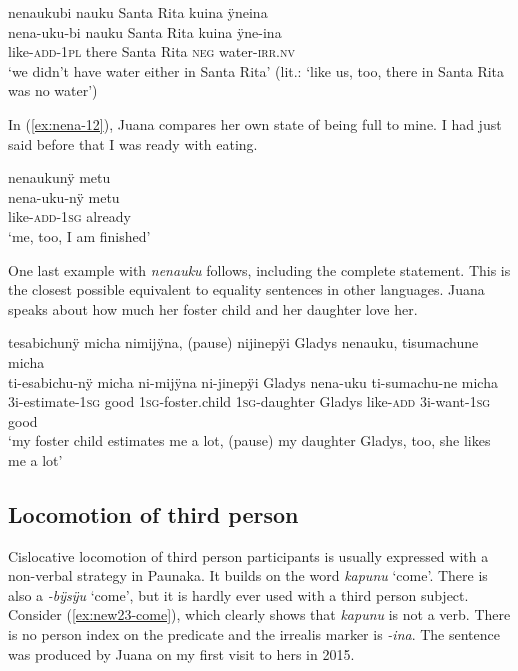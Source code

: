 \ea\label{ex:nena-10}
\begingl
\glpreamble nenaukubi nauku Santa Rita kuina ÿneina\\
\gla nena-uku-bi nauku {Santa Rita} kuina ÿne-ina\\
\glb like-\textsc{add}-1\textsc{pl} there {Santa Rita} \textsc{neg} water-\textsc{irr.nv}\\
\glft ‘we didn’t have water either in Santa Rita’ (lit.: ‘like us, too, there in Santa Rita was no water’)
\endgl
\trailingcitation{[mqx-p110826l.103]}
\xe

In (\ref{ex:nena-12}), Juana compares her own state of being full to mine. I had just said before that I was ready with eating.

\ea\label{ex:nena-12}
\begingl 
\glpreamble nenaukunÿ metu\\
\gla nena-uku-nÿ metu\\ 
\glb like-\textsc{add}-1\textsc{sg} already\\ 
\glft ‘me, too, I am finished’\\ 
\endgl
\trailingcitation{[jxx-p120515l-2.262]}
\xe

One last example with \textit{nenauku} follows, including the complete statement. This is the closest possible equivalent to equality sentences in other languages. Juana speaks about how much her foster child and her daughter love her.

\ea\label{ex:nena-11}
\begingl
\glpreamble tesabichunÿ micha nimijÿna, \textup{(pause)} nijinepÿi Gladys nenauku, tisumachune micha\\
\gla ti-esabichu-nÿ micha ni-mijÿna ni-jinepÿi Gladys nena-uku ti-sumachu-ne micha\\
\glb 3i-estimate-1\textsc{sg} good 1\textsc{sg}-foster.child 1\textsc{sg}-daughter Gladys like-\textsc{add} 3i-want-1\textsc{sg} good\\
\glft ‘my foster child estimates me a lot, (pause) my daughter Gladys, too, she likes me a lot’
\endgl
\trailingcitation{[jxx-p110923l-1.212-214]}
\xe
{}

\subsection{Locomotion of third person}\label{sec:Kapunu}

Cislocative locomotion of third person participants is usually expressed with a non-verbal strategy in Paunaka. It builds on the word \textit{kapunu} ‘come’. There is also a  \textit{-bÿsÿu} ‘come’, but it is hardly ever used with a third person subject. Consider (\ref{ex:new23-come}), which clearly shows that \textit{kapunu} is not a verb. There is no person index on the predicate and the irrealis marker is \textit{-ina}. The sentence was produced by Juana on my first visit to hers in 2015.

